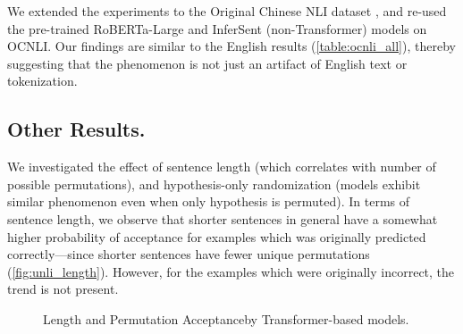 \documentclass[letterpaper, 12pt]{report}
\newcommand{\PermAcc}{Permutation Acceptance} %
\begin{document}


We extended the experiments to the Original Chinese NLI dataset \citep[OCNLI]{hu-etal-2020-ocnli}, and re-used the pre-trained RoBERTa-Large and InferSent (non-Transformer) models on OCNLI. Our findings are similar to the English results (\autoref{table:ocnli_all}), thereby suggesting that the phenomenon is not just an artifact of English text or tokenization.

\subsection{Other Results.} We investigated the effect of sentence length (which correlates with number of possible permutations), and hypothesis-only randomization (models exhibit similar phenomenon even when only hypothesis is permuted). In terms of sentence length, we observe that shorter sentences in general have a somewhat higher probability of acceptance for examples which was originally predicted correctly---since shorter sentences have fewer unique permutations (\autoref{fig:unli_length}). However, for the examples which were originally incorrect, the trend is not present.

\begin{figure}[ht]
    \centering
    \caption{Length and \PermAcc by Transformer-based models.}
    \label{fig:unli_length}
\end{figure}
\end{document}

